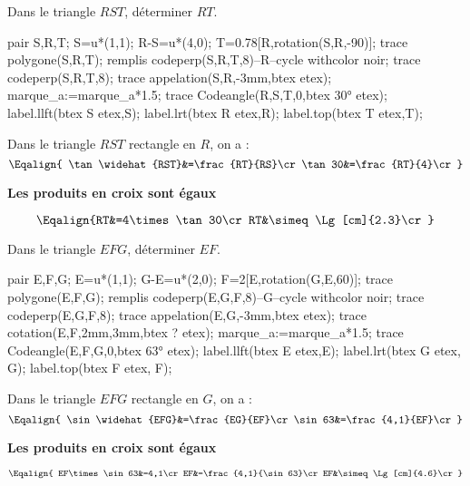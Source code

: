\begin{methode}
    \exercice
    Dans le triangle $RST$, déterminer $RT$.\\
    \begin{Geometrie}[CoinHD={(6u,4.5u)}]        
        pair S,R,T;
        S=u*(1,1);
        R-S=u*(4,0);
        T=0.78[R,rotation(S,R,-90)];
        trace polygone(S,R,T);
        remplis codeperp(S,R,T,8)--R--cycle withcolor noir;
        trace codeperp(S,R,T,8);
        trace appelation(S,R,-3mm,btex  etex);             
        marque_a:=marque_a*1.5;
        trace Codeangle(R,S,T,0,btex \ang{30} etex);
        label.llft(btex S etex,S);
        label.lrt(btex R etex,R);
        label.top(btex T etex,T);
    \end{Geometrie}
    \correction
    Dans le triangle $RST$ rectangle en $R$, on a : 
    $$\Eqalign{
    \tan\widehat{RST}&=\frac{RT}{RS}\cr
    \tan30&=\frac{RT}{4}\cr
    }$$
    \begin{center}
        {\bf Les produits en croix sont égaux}
    \end{center}
    $$\Eqalign{RT&=4\times\tan30\cr
    RT&\simeq \Lg[cm]{2.3}\cr
    }$$
\end{methode}

\begin{methode}
    \exercice
    Dans le triangle $EFG$, déterminer $EF$.\\
    \begin{Geometrie}[CoinHD={(4u,5u)}]        
        pair E,F,G;
        E=u*(1,1);
        G-E=u*(2,0);
        F=2[E,rotation(G,E,60)];
        trace polygone(E,F,G);
        remplis codeperp(E,G,F,8)--G--cycle withcolor noir;
        trace codeperp(E,G,F,8);
        trace appelation(E,G,-3mm,btex  etex);        
        trace cotation(E,F,2mm,3mm,btex ? etex);
        marque_a:=marque_a*1.5;
        trace Codeangle(E,F,G,0,btex \ang{63} etex);
        label.llft(btex E etex,E);
        label.lrt(btex G etex, G);
        label.top(btex F etex, F);
    \end{Geometrie}
    \correction
    Dans le triangle $EFG$ rectangle en $G$, on a :
    $$\Eqalign{
    \sin\widehat{EFG}&=\frac{EG}{EF}\cr
    \sin63&=\frac{4,1}{EF}\cr
    }$$
    \begin{center}
    {\bf Les produits en croix sont égaux}
    \end{center}
    $$\Eqalign{
    EF\times\sin63&=4,1\cr
    EF&=\frac{4,1}{\sin63}\cr
    EF&\simeq\Lg[cm]{4.6}\cr
    }$$
\end{methode}

